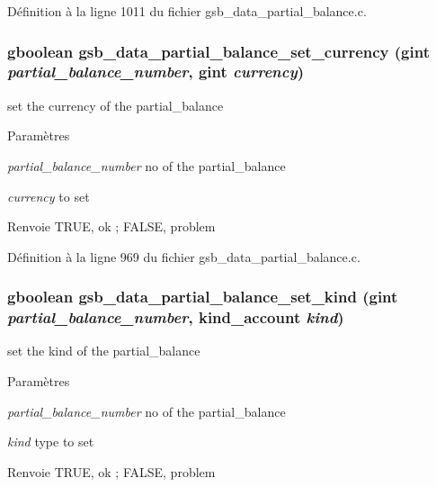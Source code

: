 Définition à la ligne 1011 du fichier gsb\_\-data\_\-partial\_\-balance.c.

\subsubsection[{gsb\_\-data\_\-partial\_\-balance\_\-set\_\-currency}]{\setlength{\rightskip}{0pt plus 5cm}gboolean gsb\_\-data\_\-partial\_\-balance\_\-set\_\-currency (gint {\em partial\_\-balance\_\-number}, \/  gint {\em currency})}\label{gsb__data__partial__balance_8c_af4cb703ca2fc2dd7795ac931ce6c0cc7}
set the currency of the partial\_\-balance


\begin{DoxyParams}{Paramètres}
\item[{\em partial\_\-balance\_\-number}]no of the partial\_\-balance \item[{\em currency}]to set\end{DoxyParams}
\begin{DoxyReturn}{Renvoie}
TRUE, ok ; FALSE, problem 
\end{DoxyReturn}


Définition à la ligne 969 du fichier gsb\_\-data\_\-partial\_\-balance.c.

\subsubsection[{gsb\_\-data\_\-partial\_\-balance\_\-set\_\-kind}]{\setlength{\rightskip}{0pt plus 5cm}gboolean gsb\_\-data\_\-partial\_\-balance\_\-set\_\-kind (gint {\em partial\_\-balance\_\-number}, \/  {\bf kind\_\-account} {\em kind})}\label{gsb__data__partial__balance_8c_ac2900a59a974385c4946ecddb1618f83}
set the kind of the partial\_\-balance 
\begin{DoxyParams}{Paramètres}
\item[{\em partial\_\-balance\_\-number}]no of the partial\_\-balance \item[{\em kind}]type to set\end{DoxyParams}
\begin{DoxyReturn}{Renvoie}
TRUE, ok ; FALSE, problem 
\end{DoxyReturn}


